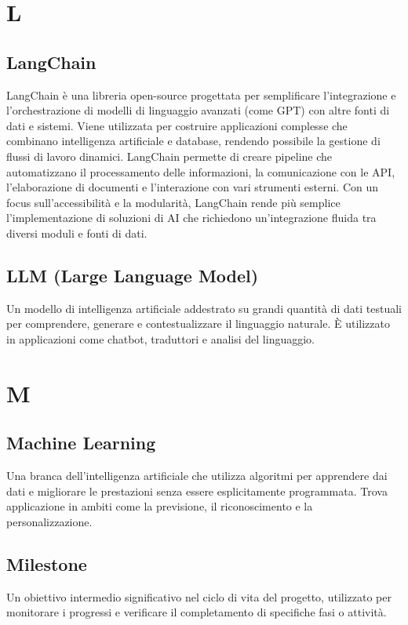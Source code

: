 \documentclass{article}
\begin{document}
\newpage

\section{L}
\subsection{LangChain}
LangChain è una libreria open-source progettata per semplificare l'integrazione e l'orchestrazione di modelli di linguaggio avanzati (come GPT) con altre fonti di dati e sistemi. Viene utilizzata per costruire applicazioni complesse che combinano intelligenza artificiale e database, rendendo possibile la gestione di flussi di lavoro dinamici. LangChain permette di creare pipeline che automatizzano il processamento delle informazioni, la comunicazione con le API, l'elaborazione di documenti e l'interazione con vari strumenti esterni. Con un focus sull'accessibilità e la modularità, LangChain rende più semplice l'implementazione di soluzioni di AI che richiedono un'integrazione fluida tra diversi moduli e fonti di dati.

\subsection{LLM (Large Language Model)}
Un modello di intelligenza artificiale addestrato su grandi quantità di dati testuali per comprendere, generare e contestualizzare il linguaggio naturale. È utilizzato in applicazioni come chatbot, traduttori e analisi del linguaggio.

\newpage

\section{M}

\subsection{Machine Learning}
Una branca dell’intelligenza artificiale che utilizza algoritmi per apprendere dai dati e migliorare le prestazioni senza essere esplicitamente programmata. Trova applicazione in ambiti come la previsione, il riconoscimento e la personalizzazione.

\subsection{Milestone}
Un obiettivo intermedio significativo nel ciclo di vita del progetto, utilizzato per monitorare i progressi e verificare il completamento di specifiche fasi o attività.
\end{document}
